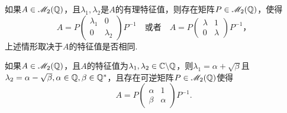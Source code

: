 \begin{mybox}
  \begin{theorem}[有理矩阵的有理标准形.]
    \begin{enum}
      \item\label{thm2.11a} 如果$A\in\mathscr M_2(\mathbb Q)$，且$\lambda_1,\lambda_2$是$A$的有理特征值，则存在矩阵$P\in\mathscr M_2(\mathbb Q)$，使得
          \[
            A = P\begin{pmatrix}
              \lambda_1 & 0 \\
              0 & \lambda_2
            \end{pmatrix}P^{-1} \quad\text{或者}\quad
            A = P\begin{pmatrix}
              \lambda & 1 \\
              0 & \lambda
            \end{pmatrix}P^{-1}，
          \]
      上述情形取决于$A$的特征值是否相同.
      \item 如果$A\in\mathscr M_2(\mathbb Q)$，且$A$的特征值为$\lambda_1,\lambda_2\in\mathbb C\backslash\mathbb Q$，则$\lambda_1=\alpha+\sqrt\beta$且
          $\lambda_2=\alpha-\sqrt\beta,
          \alpha\in\mathbb Q,\beta\in\mathbb Q^\ast$，且存在可逆矩阵$P\in\mathscr M_2(\mathbb Q)$使得
          \[
            A = P \begin{pmatrix}
              \alpha & 1 \\
              \beta & \alpha
            \end{pmatrix}P^{-1}.
          \]
    \end{enum}
  \end{theorem}
\end{mybox}

